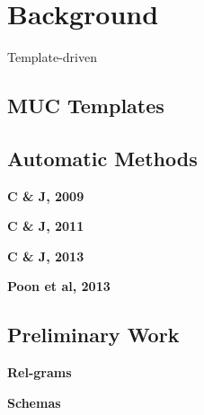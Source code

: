 \section{Background}

Template-driven 

\subsection{MUC Templates}



\subsection{Automatic Methods}

\textbf{C \& J, 2009}

\textbf{C \& J, 2011}

\textbf{C \& J, 2013}

\textbf{Poon et al, 2013}


\subsection{Preliminary Work}

\textbf{Rel-grams}

\textbf{Schemas}